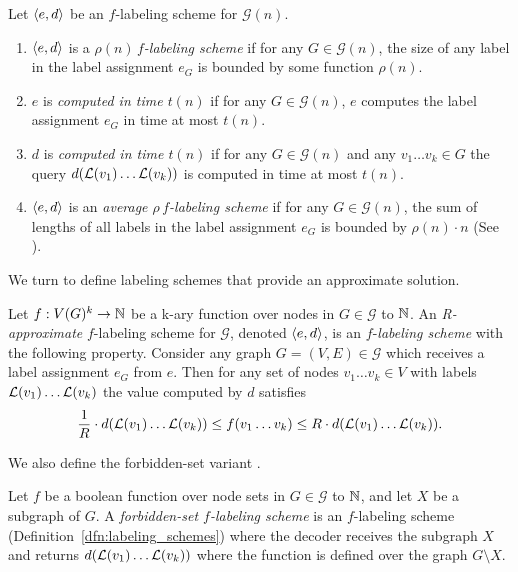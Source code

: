 \begin{definition}
	Let  $\left \langle e,d \right \rangle $ be an $f$-labeling scheme  for  $\mathcal{G}(n)$.
	\begin{enumerate}
		\item   $\left \langle e,d \right \rangle $  is a \emph{$\rho(n) \, f$-labeling scheme} if  for  any $G \in \mathcal{G}(n)$,  the size  of any label in the  label assignment $e_G$  is bounded by some function $\rho(n)$. 
		\item $e$  is  \emph{computed in time $t(n)$} if for any $G \in \mathcal{G}(n)$, $e$ computes the label assignment $e_G$  in time at most $t(n)$.
		\item  $d$ is  \emph{computed  in time $t(n)$}  if for any $G \in \mathcal{G}(n)$  and any $v_1\dots v_k \in G$  the query $d( \mathcal{L}(v_1)\dots  \mathcal{L}(v_k))$ is computed in time at most $t(n)$.
				\item   $\left \langle e,d \right \rangle $  is an \emph{average $\rho \, f$-labeling scheme}  if for  any  $G \in \mathcal{G}(n)$,  the sum of lengths of all labels in the  label assignment $e_G$  is bounded by $\rho(n) \cdot n$ (See \cite{Kano07}). 
	\end{enumerate}

\end{definition}


We turn to define labeling schemes that provide an approximate solution.
\begin{definition} \label{dfn:approx-label}
Let $f : V(G)^k  \rightarrow  \mathbb{N}$ be a k-ary function  over nodes in  $G \in \mathcal{G}$ to $ \mathbb{N}$.
An \emph{R-approximate}  $f$-labeling scheme for $\mathcal{G}$, denoted  $\left \langle e,d \right \rangle $, is an $f$-\emph{labeling scheme} with the following property.
Consider any graph $G=(V,E) \in \mathcal{G}$ which receives a label assignment $e_G$ from $e$. Then for any set of nodes $v_1\dots v_k\in V$ with labels  $ \mathcal{L}(v_1)\dots  \mathcal{L}(v_k) $ the value computed by $d$ satisfies 
\[ \frac{1}{R} \cdot d( \mathcal{L}(v_1)\dots  \mathcal{L}(v_k)) \leq  f(v_1\dots v_k) \leq {R} \cdot d( \mathcal{L}(v_1)\dots  \mathcal{L}(v_k)).   \]
\end{definition}

We also define the forbidden-set variant \cite{courcelle2007forbidden}.
\begin{definition}\label{dfn:forbidden}
				Let  $f$ be a boolean function over node sets  in  $G \in \mathcal{G}$ to $ \mathbb{N}$, and let $X$ be a subgraph of $G$.
				 A \emph{forbidden-set $f$-labeling scheme } is an $f$-labeling scheme (Definition~\ref{dfn:labeling_schemes})  where the decoder receives the subgraph $X$ and returns $d( \mathcal{L}(v_1) \dots  \mathcal{L}(v_k))$ where the function is defined over the graph $G \setminus X$.
		
			\end{definition}


